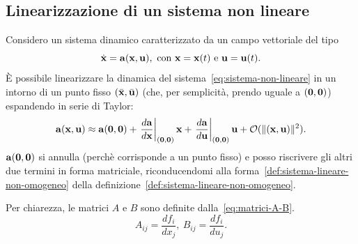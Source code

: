 \subsection{Linearizzazione di un sistema non lineare}
\label{subsec:linearizzazione}
Considero un sistema dinamico caratterizzato da un campo vettoriale del tipo
\begin{equation}
    \dot {\b x} = \b a(\b x, \b u),\ \text{con}\ \b x = \b x (t)\ \text e \ \b u = \b u (t).
    \label{eq:sistema-non-lineare}
\end{equation}
È possibile linearizzare la dinamica del sistema~\eqref{eq:sistema-non-lineare} in un intorno di un punto fisso
$(\bar{\mathbf{x}}, \bar{\mathbf{u}})$ (che, per semplicità, prendo uguale a $(\mathbf{0}, \mathbf{0})$) espandendo
in serie di Taylor:
\begin{equation}
    \mathbf{a}(\mathbf{x}, \mathbf{u}) \approx \mathbf{a}(\mathbf{0}, \mathbf{0}) +
    \left.\frac{d \mathbf{a}}{d \mathbf{x}}\right|_{(\mathbf{0}, \mathbf{0})} \mathbf{x} +
    \left.\frac{d \mathbf{a}}{d \mathbf{u}}\right|_{(\mathbf{0}, \mathbf{0})} \mathbf{u} + \mathcal O(\lVert(\mathbf{x}, \mathbf{u})\rVert^2).
    \label{eq:formula-linearizzazione}
\end{equation}
$\mathbf{a}(\mathbf{0}, \mathbf{0})$ si annulla (perchè corrisponde a un punto fisso) e posso riscrivere
gli altri due termini in forma matriciale, riconducendomi alla forma~\eqref{def:sistema-lineare-non-omogeneo}
della definizione~\ref{def:sistema-lineare-non-omogeneo}.

Per chiarezza, le matrici $A$ e $B$ sono definite dalla~\eqref{eq:matrici-A-B}.
\begin{equation}
    A_{ij} = \frac{df_i}{dx_j},\ B_{ij} = \frac{df_i}{du_j}.
    \label{eq:matrici-A-B}
\end{equation}

